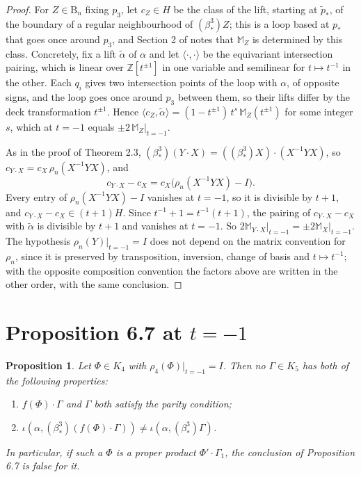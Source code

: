 \documentclass[11pt]{amsart}
\newtheorem{proposition}[lemma]{Proposition}
\theoremstyle{remark}
\newcommand{\M}{\mathbb{M}}
\newcommand{\B}{\mathrm{B}}
\newcommand{\bs}{\beta^3_*}
\newcommand{\at}{\big|_{t=-1}}
\begin{document}
\begin{proof}
For $Z\in \B_n$ fixing $p_3$, let $c_Z\in H$ be the class of the lift, starting at $\tilde p_*$, of the boundary of a regular neighbourhood of $(\bs)Z$; this is a loop based at $p_*$ that goes once around $p_3$, and Section 2 of \cite{BBB} notes that $\M_Z$ is determined by this class. Concretely, fix a lift $\tilde\alpha$ of $\alpha$ and let $\langle\cdot,\cdot\rangle$ be the equivariant intersection pairing, which is linear over $\mathbb{Z}[t^{\pm1}]$ in one variable and semilinear for $t\mapsto t^{-1}$ in the other. Each $q_i$ gives two intersection points of the loop with $\alpha$, of opposite signs, and the loop goes once around $p_3$ between them, so their lifts differ by the deck transformation $t^{\pm1}$. Hence $\langle c_Z,\tilde\alpha\rangle=(1-t^{\pm1})\,t^{s}\,\M_Z(t^{\pm1})$ for some integer $s$, which at $t=-1$ equals $\pm2\,\M_Z\at$.

As in the proof of Theorem 2.3, $(\bs)(Y\cdot X)=((\bs)X)\cdot(X^{-1}YX)$, so $c_{Y\cdot X}=c_X\,\rho_n(X^{-1}YX)$, and
\[
c_{Y\cdot X}-c_X=c_X\bigl(\rho_n(X^{-1}YX)-I\bigr).
\]
Every entry of $\rho_n(X^{-1}YX)-I$ vanishes at $t=-1$, so it is divisible by $t+1$, and $c_{Y\cdot X}-c_X\in(t+1)H$. Since $t^{-1}+1=t^{-1}(t+1)$, the pairing of $c_{Y\cdot X}-c_X$ with $\tilde\alpha$ is divisible by $t+1$ and vanishes at $t=-1$. So $2\M_{Y\cdot X}\at=\pm2\M_X\at$. The hypothesis $\rho_n(Y)\at=I$ does not depend on the matrix convention for $\rho_n$, since it is preserved by transposition, inversion, change of basis and $t\mapsto t^{-1}$; with the opposite composition convention the factors above are written in the other order, with the same conclusion.
\end{proof}

\section{\texorpdfstring{Proposition 6.7 at $t=-1$}{Proposition 6.7 at t = -1}}

\begin{proposition}\label{prop:main}
Let $\Phi\in K_4$ with $\rho_4(\Phi)\at=I$. Then no $\Gamma\in K_5$ has both of the following properties:
\begin{enumerate}
\item[(i)] $f(\Phi)\cdot\Gamma$ and $\Gamma$ both satisfy the parity condition;
\item[(ii)] $\iota(\alpha,(\bs)(f(\Phi)\cdot\Gamma))\neq\iota(\alpha,(\bs)\Gamma)$.
\end{enumerate}
In particular, if such a $\Phi$ is a proper product $\Phi'\cdot\Gamma_1$, the conclusion of Proposition 6.7 is false for it.
\end{proposition}
\end{document}
